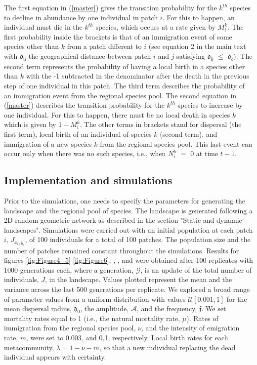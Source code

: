\documentclass[a4paper,12pt]{article}
\begin{document}
The first equation in (\ref{master}) gives the transition probability
for the $k^{th}$ species to decline in abundance by one individual in
patch $i$. For this to happen, an individual must die in the $k^{th}$
species, which occurs at a rate given by $M^{k}_{i}$. The first
probability inside the brackets is that of an immigration event of
some species other than $k$ from a patch different to $i$ (see
equation 2 in the main text with $\mathfrak{d_{ij}}$ the geographical
distance between patch $i$ and $j$ satisfying $\mathfrak{d_{ij}}$
$\leq$ $\mathfrak{d_{c}}$). The second term represents the probability
of having a local birth in a species other than $k$ with the -1
subtracted in the denominator after the death in the previous step of
one individual in this patch. The third term describes the probability
of an immigration event from the regional species pool. The second
equation in (\ref{master}) describes the transition probability for
the $k^{th}$ species to increase by one individual. For this to
happen, there must be no local death in species $k$ which is given by
$1 - M^{k}_{i}$. The other terms in brackets stand for dispersal (the
first term), local birth of an individual of species $k$ (second
term), and immigration of a new species $k$ from the regional species
pool. This last event can occur only when there was no such species,
i.e., when $N_{i}^{k}$ $=$ 0 at time $t - 1$.  

   
\subsection*{Implementation and simulations}

Prior to the simulations, one needs to specify the parameters for generating the landscape and the regional pool of species. The landscape is generated following a 2D-random geometric network as described in the section "Static and dynamic landscapes". Simulations were carried out with an initial population at each patch $i$, $J_{x_i,y_i}$, of 100 individuals for a total of 100 patches. The population size and the number of patches remained constant throughout the simulations. Results for figures \ref{fig:Figure4_5}-\ref{fig:Figure6}, , , and  were obtained after 100 replicates with 1000 generations each, where a generation, $\mathcal{G}$, is an update of the total number of individuals, $J$, in the landscape. Values plotted represent the mean and the variance across the last 500 generations per replicate. We explored a broad range of parameter values from a uniform distribution with values $\mathcal{U}[0.001,1]$ for the mean dispersal radius, $\mathfrak{d_{0}}$, the amplitude, $\mathcal{A}$, and the frequency, $\mathfrak{f}$. We set mortality rates equal to 1 (i.e., the natural mortality rate, $\mu$). Rates of immigration from the regional species pool, $\nu$, and the intensity of emigration rate, $m$, were set to 0.003, and 0.1, respectively. Local birth rates for each metacommunity, $\lambda = 1 - \nu - m$, so that a new individual replacing the dead individual appears with certainty.
    
\end{document}

